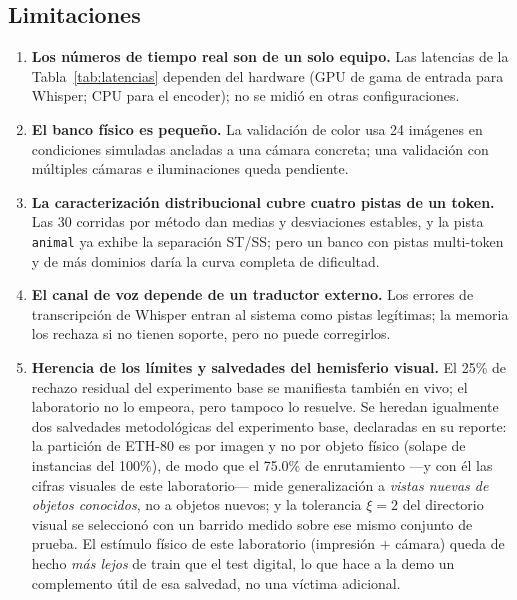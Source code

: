 \subsection{Limitaciones}

\begin{enumerate}
    \item \textbf{Los números de tiempo real son de un solo equipo.} Las latencias de
    la Tabla~\ref{tab:latencias} dependen del hardware (GPU de gama de entrada para
    Whisper; CPU para el encoder); no se midió en otras configuraciones.
    \item \textbf{El banco físico es pequeño.} La validación de color usa 24 imágenes
    en condiciones simuladas ancladas a una cámara concreta; una validación con
    múltiples cámaras e iluminaciones queda pendiente.
    \item \textbf{La caracterización distribucional cubre cuatro pistas de un
    token.} Las 30 corridas por método dan medias y desviaciones estables, y la
    pista \texttt{animal} ya exhibe la separación ST/SS; pero un banco con pistas
    multi-token y de más dominios daría la curva completa de dificultad.
    \item \textbf{El canal de voz depende de un traductor externo.} Los errores de
    transcripción de Whisper entran al sistema como pistas legítimas; la memoria los
    rechaza si no tienen soporte, pero no puede corregirlos.
    \item \textbf{Herencia de los límites y salvedades del hemisferio visual.} El
    25\% de rechazo residual del experimento base se manifiesta también en vivo; el
    laboratorio no lo empeora, pero tampoco lo resuelve.
    Se heredan igualmente dos salvedades metodológicas del experimento base,
    declaradas en su reporte: la partición de ETH-80 es por imagen y no por objeto
    físico (solape de instancias del 100\%), de modo que el 75.0\% de enrutamiento
    ---y con él las cifras visuales de este laboratorio--- mide generalización a
    \emph{vistas nuevas de objetos conocidos}, no a objetos nuevos; y la tolerancia
    $\xi = 2$ del directorio visual se seleccionó con un barrido medido sobre ese
    mismo conjunto de prueba.
    El estímulo físico de este laboratorio (impresión $+$ cámara) queda de hecho
    \emph{más lejos} de train que el test digital, lo que hace a la demo un
    complemento útil de esa salvedad, no una víctima adicional.
\end{enumerate}
